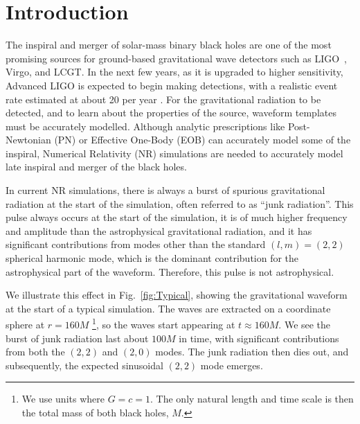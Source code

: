 \section{Introduction}
The inspiral and merger of solar-mass binary black holes are one of
the most promising sources for ground-based gravitational wave
detectors such as LIGO~\cite{Barish:1999},
Virgo\cite{Acernese-etal:2006}, and LCGT\cite{Kuroda:2010}. In the
next few years, as it is upgraded to higher sensitivity, Advanced
LIGO is expected to begin making detections, with a realistic event
rate estimated at about 20 per year \cite{Abadie:2010cfa}.
For the gravitational radiation to be detected, and to learn about the
properties of the source, waveform templates must be accurately
modelled.  Although analytic prescriptions like Post-Newtonian (PN)\cite{Blanchet2006} or
Effective One-Body (EOB)\cite{Buonanno99} can accurately model some of the inspiral,
Numerical Relativity (NR) simulations are needed to accurately model
late inspiral and merger of the black holes.

In current NR simulations, there is always a burst of spurious
gravitational radiation at the start of the simulation, often referred to as
``junk radiation''. This pulse
always occurs at the start of the simulation, it is of much higher frequency and amplitude
than the astrophysical gravitational radiation, and it has significant
contributions from modes other than the standard $(l,m) = (2,2)$
spherical harmonic mode, which is the dominant contribution for the
astrophysical part of the waveform.  Therefore, this pulse is not astrophysical.

We illustrate this effect in Fig.~\ref{fig:Typical}, showing the
gravitational waveform  at the start of a
typical simulation. The waves are extracted on a coordinate sphere at
$r=160M$ \footnote{We use units where $G=c=1$. The only natural length
  and time scale is then the total mass of both black holes, $M$.}, so
the waves start appearing at $t\approx 160M$. We see the burst of junk
radiation last about $100M$ in time, with significant contributions
from both the $(2,2)$ and $(2,0)$ modes. The junk radiation then dies out,
and subsequently, the expected sinusoidal $(2,2)$ mode emerges.

